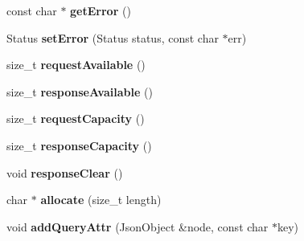 \begin{DoxyCompactItemize}
\item 
\hypertarget{classfirestep_1_1_json_command_a50064a31b57d68d2aa26408ad19e132d}{const char $\ast$ {\bfseries get\+Error} ()}\label{classfirestep_1_1_json_command_a50064a31b57d68d2aa26408ad19e132d}

\item 
\hypertarget{classfirestep_1_1_json_command_a017a69509a155996f74ac9ab14011fb4}{Status {\bfseries set\+Error} (Status status, const char $\ast$err)}\label{classfirestep_1_1_json_command_a017a69509a155996f74ac9ab14011fb4}

\item 
\hypertarget{classfirestep_1_1_json_command_a735a49fec2c5971eb1cb1931868498ff}{size\+\_\+t {\bfseries request\+Available} ()}\label{classfirestep_1_1_json_command_a735a49fec2c5971eb1cb1931868498ff}

\item 
\hypertarget{classfirestep_1_1_json_command_a9f0c38e162c823239de9c6b9f66d8b68}{size\+\_\+t {\bfseries response\+Available} ()}\label{classfirestep_1_1_json_command_a9f0c38e162c823239de9c6b9f66d8b68}

\item 
\hypertarget{classfirestep_1_1_json_command_a5d3bdb1c9fa849772e8fefefdf0b6cb4}{size\+\_\+t {\bfseries request\+Capacity} ()}\label{classfirestep_1_1_json_command_a5d3bdb1c9fa849772e8fefefdf0b6cb4}

\item 
\hypertarget{classfirestep_1_1_json_command_a551c8f29c2cee51a8b63e0677e370b24}{size\+\_\+t {\bfseries response\+Capacity} ()}\label{classfirestep_1_1_json_command_a551c8f29c2cee51a8b63e0677e370b24}

\item 
\hypertarget{classfirestep_1_1_json_command_a06e0d10496ac3f0901b820aca5592f62}{void {\bfseries response\+Clear} ()}\label{classfirestep_1_1_json_command_a06e0d10496ac3f0901b820aca5592f62}

\item 
\hypertarget{classfirestep_1_1_json_command_a9c237e80cea28bbf85138041e08f6640}{char $\ast$ {\bfseries allocate} (size\+\_\+t length)}\label{classfirestep_1_1_json_command_a9c237e80cea28bbf85138041e08f6640}

\item 
\hypertarget{classfirestep_1_1_json_command_a238279d60501a357ca4b48e798838378}{void {\bfseries add\+Query\+Attr} (Json\+Object \&node, const char $\ast$key)}\label{classfirestep_1_1_json_command_a238279d60501a357ca4b48e798838378}

\end{DoxyCompactItemize}
